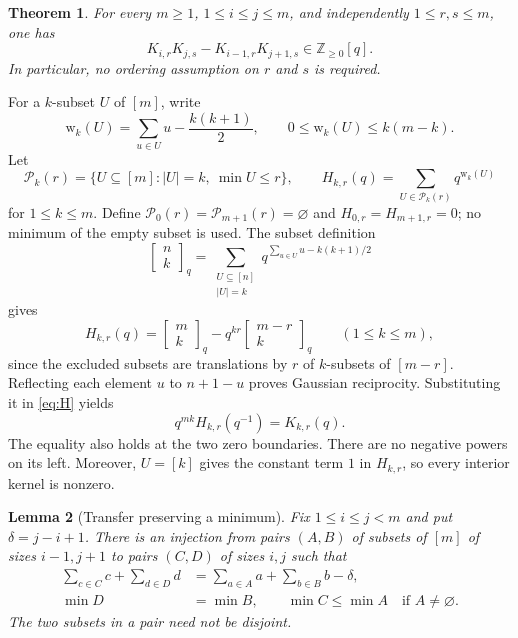 \documentclass[11pt,a4paper]{article}
\newtheorem{theorem}{Theorem}
\newtheorem{lemma}[theorem]{Lemma}
\theoremstyle{remark}
\newcommand{\NN}{\mathbb Z_{\geq0}}
\newcommand{\wt}{\mathrm w}
\begin{document}
\begin{theorem}\label{thm:kernel}
For every $m\geq1$, $1\leq i\leq j\leq m$, and independently
$1\leq r,s\leq m$, one has
\begin{equation}\label{eq:kernel}
 K_{i,r}K_{j,s}-K_{i-1,r}K_{j+1,s}\in\NN[q].
\end{equation}
In particular, no ordering assumption on $r$ and $s$ is required.
\end{theorem}

For a $k$-subset $U$ of $[m]$, write
\[
 \wt_k(U)=\sum_{u\in U}u-\frac{k(k+1)}2,
 \qquad 0\leq\wt_k(U)\leq k(m-k).
\]
Let
\[
 \mathcal P_k(r)=\{U\subseteq[m]:|U|=k,\ \min U\leq r\},
 \qquad H_{k,r}(q)=\sum_{U\in\mathcal P_k(r)}q^{\wt_k(U)}
\]
for $1\leq k\leq m$. Define
$\mathcal P_0(r)=\mathcal P_{m+1}(r)=\varnothing$ and
$H_{0,r}=H_{m+1,r}=0$; no minimum of the empty subset is used.
The subset definition
\[
 \left[\begin{smallmatrix}n\\k\end{smallmatrix}\right]_{q}=\sum_{\substack{U\subseteq[n]\\|U|=k}}
 q^{\sum_{u\in U}u-k(k+1)/2}
\]
gives
\begin{equation}\label{eq:H}
 H_{k,r}(q)=\left[\begin{smallmatrix}m\\k\end{smallmatrix}\right]_{q}-q^{kr}\left[\begin{smallmatrix}m-r\\k\end{smallmatrix}\right]_{q}
 \qquad(1\leq k\leq m),
\end{equation}
since the excluded subsets are translations by $r$ of $k$-subsets of
$[m-r]$. Reflecting each element $u$ to $n+1-u$ proves Gaussian
reciprocity. Substituting it in \eqref{eq:H} yields
\begin{equation}\label{eq:reverse}
 q^{mk}H_{k,r}(q^{-1})=K_{k,r}(q).
\end{equation}
The equality also holds at the two zero boundaries. There are no negative
powers on its left. Moreover, $U=[k]$ gives the constant term $1$ in
$H_{k,r}$, so every interior kernel is nonzero.

\begin{lemma}[Transfer preserving a minimum]\label{lem:transfer}
Fix $1\leq i\leq j<m$ and put $\delta=j-i+1$. There is an injection
from pairs $(A,B)$ of subsets of $[m]$ of sizes $i-1,j+1$ to pairs
$(C,D)$ of sizes $i,j$ such that
\begin{align}
 \sum_{c\in C}c+\sum_{d\in D}d
   &=\sum_{a\in A}a+\sum_{b\in B}b-\delta,\label{eq:sum}\\
 \min D&=\min B,\qquad
 \min C\leq\min A\quad\text{if }A\ne\varnothing.\label{eq:min}
\end{align}
The two subsets in a pair need not be disjoint.
\end{lemma}
\end{document}

